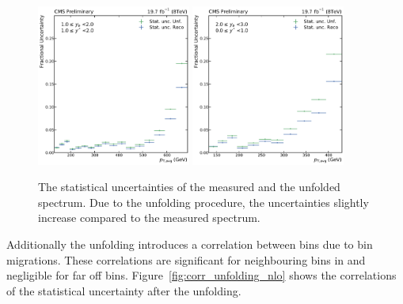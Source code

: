 \begin{figure}[htbp]
    \includegraphics[width=0.45\textwidth]{figures/measurement/statunc_fractional_yb1ys1.pdf}\hfill
    \includegraphics[width=0.45\textwidth]{figures/measurement/statunc_fractional_yb2ys0.pdf}
    \caption{The statistical uncertainties of the measured and the unfolded spectrum. Due
    to the unfolding procedure, the uncertainties slightly increase compared to the
    measured spectrum.}
    \label{fig:statunc_relative}
\end{figure}

Additionally the unfolding introduces a correlation between bins due to bin
migrations. These correlations are significant for neighbouring bins in \pt and
negligible for far off bins. Figure~\ref{fig:corr_unfolding_nlo} shows the
correlations of the statistical uncertainty after the unfolding.

